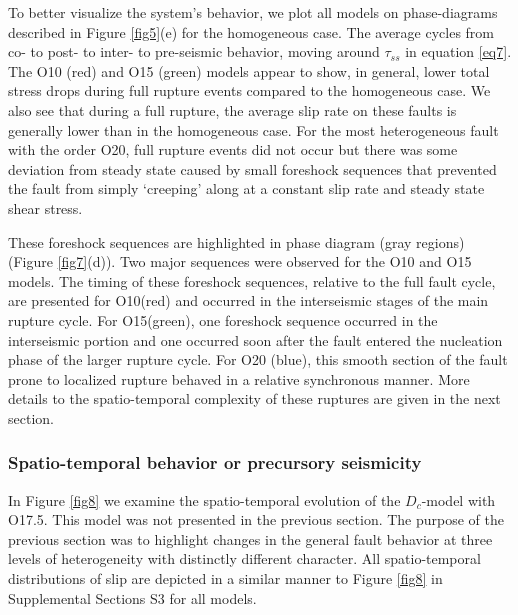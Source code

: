 \documentclass[preprint,1p, 10pt,authoryear]{elsarticle}
\begin{document}
To better visualize the system's behavior, we plot all models on phase-diagrams described in Figure \ref{fig5}(e) for the homogeneous case. The average cycles from co- to post- to inter- to pre-seismic behavior, moving around $\tau_{ss}$ in equation \eqref{eq7}. The O10 (red) and O15 (green) models appear to show, in general, lower total stress drops during full rupture events compared to the homogeneous case.  We also see that during a full rupture, the average slip rate on these faults is generally lower than in the homogeneous case.  For the most heterogeneous fault with the order O20, full rupture events did not occur but there was some deviation from steady state caused by small foreshock sequences that prevented the fault from simply `creeping' along at a constant slip rate and steady state shear stress. 

These foreshock sequences are highlighted in phase diagram (gray regions) (Figure \ref{fig7}(d)). Two major sequences were observed for the O10 and O15 models. The timing of these foreshock sequences, relative to the full fault cycle, are presented for O10(red) and occurred in the interseismic stages of the main rupture cycle. For O15(green), one foreshock sequence occurred in the interseismic portion and one occurred soon after the fault entered the nucleation phase of the larger rupture cycle. For O20 (blue), this smooth section of the fault prone to localized rupture behaved in a relative synchronous manner. More details to the spatio-temporal complexity of these ruptures are given in the next section. 

\subsubsection{Spatio-temporal behavior or precursory seismicity }
\label{spatialmodel}

In Figure \ref{fig8} we examine the spatio-temporal evolution of the $D_{c}$-model with O17.5. This model was not presented in the previous section. The purpose of the previous section was to highlight changes in the general fault behavior at three levels of heterogeneity with distinctly different character. All spatio-temporal distributions of slip are depicted in a similar manner to Figure \ref{fig8} in Supplemental Sections S3 for all models.
\end{document}
